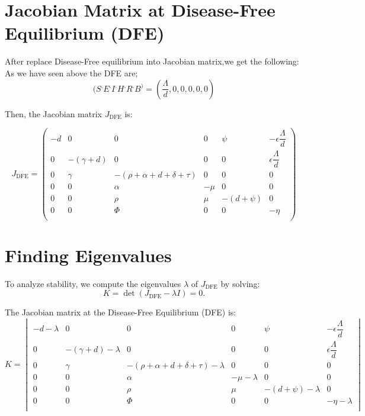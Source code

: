 \documentclass[a4paper,12pt]{report}
\begin{document}
\begin{itemize}
\section*{Jacobian Matrix at Disease-Free Equilibrium (DFE)}
After replace Disease-Free equilibrium into Jacobian matrix,we get the following:
As we have seen above the DFE are; 
\[
(S^, E^, I^, H^, R^, B^) = \left( \frac{\Lambda}{d}, 0, 0, 0, 0, 0 \right)
\]

Then, the Jacobian matrix \( J_{\text{DFE}} \) is:

\[
J_{\text{DFE}} =
\begin{pmatrix}
- d & 0 & 0 & 0 & \psi & - \epsilon \dfrac{\Lambda}{d} \\
0 & -(\gamma + d) & 0 & 0 & 0 & \epsilon \dfrac{\Lambda}{d} \\
0 & \gamma & - ( \rho + \alpha + d + \delta + \tau ) & 0 & 0 & 0 \\
0 & 0 & \alpha & -\mu & 0 & 0 \\
0 & 0 & \rho & \mu & - (d + \psi) & 0 \\
0 & 0 & \Phi & 0 & 0 & -\eta \\
\end{pmatrix}
\]





\section*{Finding Eigenvalues}

To analyze stability, we compute the eigenvalues \(\lambda\) of \(J_{\text{DFE}}\) by solving:
\[
K=\det(J_{\text{DFE}} - \lambda I) = 0.
\]

The Jacobian matrix at the Disease-Free Equilibrium (DFE) is:
\[
K =
\begin{vmatrix}
- d-\lambda & 0 & 0 & 0 & \psi & - \epsilon \dfrac{\Lambda}{d} \\
0 & -(\gamma + d)-\lambda & 0 & 0 & 0 & \epsilon \dfrac{\Lambda}{d} \\
0 & \gamma & - ( \rho + \alpha + d + \delta + \tau )-\lambda & 0 & 0 & 0 \\
0 & 0 & \alpha & -\mu-\lambda & 0 & 0 \\
0 & 0 & \rho & \mu & - (d + \psi)-\lambda & 0 \\
0 & 0 & \Phi & 0 & 0 & -\eta-\lambda \\
\end{vmatrix}
\]




\end{itemize}
\end{document}
